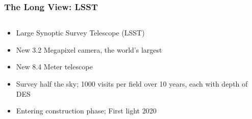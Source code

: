 \documentclass{beamer}
\begin{document}
\frame
{
    \frametitle{The Long View: LSST}

    \begin{columns}
        \begin{column}{0.5\textwidth}    

            \begin{itemize}

                \item Large Synoptic Survey Telescope (LSST)

                \item New 3.2 Megapixel camera, the world's largest

                \item New 8.4 Meter telescope

                \item Survey half the sky; 1000 visits per field over 10 years, each
                    with depth of DES 

                \item Entering construction phase; First light 2020


\end{itemize}
\end{column}
\end{columns}}
\end{document}
